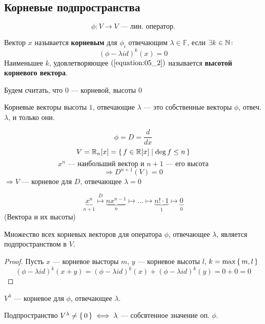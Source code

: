 \subsection{Корневые подпространства}
\[
\phi \colon V \rightarrow V \text{ --- лин. оператор.}
\]
\begin{definition}
  Вектор $x$ называется \textbf{корневым} для $\phi_i$ отвечающим $\lambda \in \mathbb{F}$, если $\exists k \in \mathbb{N}\colon$
  \begin{equation}
    \label{equation:05_2}
    (\phi - \lambda id)^{k}(x) = 0
  \end{equation}
  Наименьшее $k$, удовлетворяющее $(\ref{equation:05_2})$ называется \textbf{высотой корневого вектора}.
\end{definition}
\begin{note}
  Будем считать, что $0$ --- корневой, высоты $0$
\end{note}
Корневые векторы высоты $1$, отвечающие $\lambda$ --- это собственные векторы $\phi$, отвеч. $\lambda$, и только они.
\begin{example}
  \[
  \phi = D = \frac{d}{dx}
\]
 \[
 V = \mathbb{R}_{n}[x] = \set{f \in \mathbb{R}[x] | \deg f \leq n}
 \] 
 \[
  x^{n} \text{ --- наибольший вектор и $n + 1$ --- его высота}
 \]
 \[
 \Rightarrow D^{n + 1}(V) = 0
 \]
 $\Rightarrow V$ --- корневое для $D$, отвечающее $\lambda = 0$
\end{example}
\[
\underbrace{x^{n}}_{n + 1} \overset{D}{\mapsto} \underbrace{n x^{n - 1}}_{n} \mapsto \ldots \mapsto \underbrace{n! \cdot 1}_{1} \mapsto \underbrace{0}_{0}
\]
(Вектора и их высоты)
\begin{statement}
  \label{statement:05_2}
  Множество всех корневых векторов для оператора $\phi$, отвечающее $\lambda$, является подпространством в $V$.
\end{statement}
\begin{proof}
  Пусть $x$ --- корневое высторы $m$, $y$ --- корневое высоты $l$, $k = \max \set{m, l}$
  \[
    (\phi - \lambda id)^{k}(x + y) = (\phi - \lambda id)^{k}(x) + (\phi - \lambda id)^{k}(y) = 0 + 0 = 0
  \]
\end{proof}
\begin{symb}
  $V^{\lambda}$ --- корневое для $\phi$, отвечающее $\lambda$.
\end{symb}
\begin{statement}
  \label{statement:05_3}
  Подпространство $V^{\lambda} \neq \set{0} \iff \lambda$ --- собсвтенное значение оп. $\phi$.
\end{statement}
